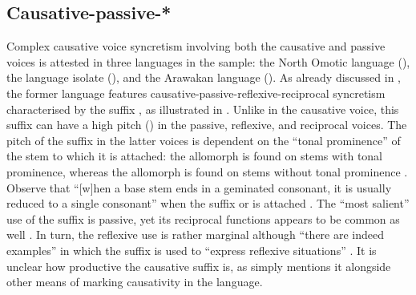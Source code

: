\subsection{Causative-passive-*} \label{sec:complex-syncretism:caus-pass}
Complex causative voice syncretism involving both the causative and passive voices is attested in three languages in the sample: the North Omotic language  (), the language isolate  (), and the Arawakan language  (). As already discussed in , the former language features causative-passive-reflexive-reciprocal syncretism characterised by the suffix , as illustrated in . Unlike in the causative voice, this suffix can have a high pitch () in the passive, reflexive, and reciprocal voices. The pitch of the suffix in the latter voices is dependent on the “tonal prominence” of the stem to which it is attached: the allomorph  is found on stems with tonal prominence, whereas the allomorph  is found on stems without tonal prominence \citep[84ff., 1013]{wakasa:2008}. Observe that “[w]hen a base stem ends in a geminated consonant, it is usually reduced to a single consonant” when the suffix  or  is attached \citep[1014]{wakasa:2008}. The “most salient” use of the suffix  is passive, yet its reciprocal functions appears to be common as well \citep[1022ff.]{wakasa:2008}. In turn, the reflexive use is rather marginal although “there are indeed examples” in which the suffix is used to “express reflexive situations” \citep[1028]{wakasa:2008}. It is unclear how productive the causative suffix is, as \cite[1005ff.]{wakasa:2008} simply mentions it alongside other means of marking causativity in the language.

